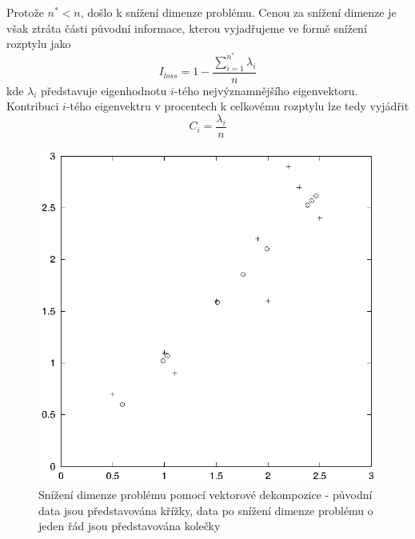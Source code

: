 \documentclass[a4paper]{book}
\begin{document}
Protože $n^* < n$, došlo k snížení dimenze problému. Cenou za snížení dimenze je však ztráta části původní informace, kterou vyjadřujeme ve formě snížení rozptylu jako
\begin{equation*}
I_{loss} = 1 - \frac{\sum_{i = 1}^{n^*}\lambda_i}{n}
\end{equation*}
kde $\lambda_i$ představuje eigenhodnotu $i$-tého nejvýznamnějšího eigenvektoru. Kontribuci $i$-tého eigenvektru v procentech k celkovému rozptylu lze tedy vyjádřit
\begin{equation*}
C_i = \frac{\lambda_i}{n}
\end{equation*}
\begin{figure}
  \centering
  \includegraphics{data.eps}
  \caption{Snížení dimenze problému pomocí vektorové dekompozice - původní data jsou představována křížky, data po snížení dimenze problému o jeden řád jsou představována kolečky}
  \label{data}
\end{figure}
\end{document}
